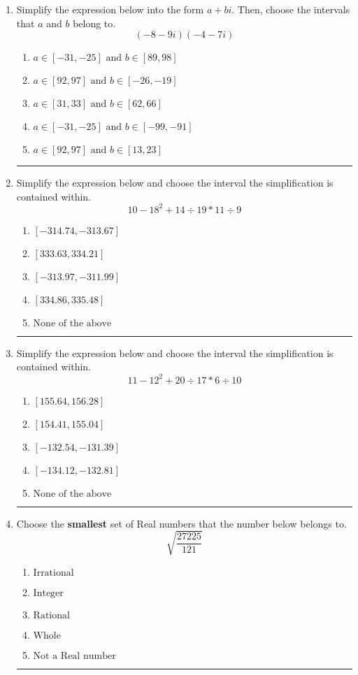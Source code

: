 \documentclass[14pt]{extbook}
\newcommand{\litem}[1]{\item#1\hspace*{-1cm}\rule{\textwidth}{0.4pt}}
\begin{document}
\begin{enumerate}
\litem{
Simplify the expression below into the form $a+bi$. Then, choose the intervals that $a$ and $b$ belong to.\[ (-8 - 9 i)(-4 - 7 i) \]\begin{enumerate}[label=\Alph*.]
\item \( a \in [-31, -25] \text{ and } b \in [89, 98] \)
\item \( a \in [92, 97] \text{ and } b \in [-26, -19] \)
\item \( a \in [31, 33] \text{ and } b \in [62, 66] \)
\item \( a \in [-31, -25] \text{ and } b \in [-99, -91] \)
\item \( a \in [92, 97] \text{ and } b \in [13, 23] \)

\end{enumerate} }
\litem{
Simplify the expression below and choose the interval the simplification is contained within.\[ 10 - 18^2 + 14 \div 19 * 11 \div 9 \]\begin{enumerate}[label=\Alph*.]
\item \( [-314.74, -313.67] \)
\item \( [333.63, 334.21] \)
\item \( [-313.97, -311.99] \)
\item \( [334.86, 335.48] \)
\item \( \text{None of the above} \)

\end{enumerate} }
\litem{
Simplify the expression below and choose the interval the simplification is contained within.\[ 11 - 12^2 + 20 \div 17 * 6 \div 10 \]\begin{enumerate}[label=\Alph*.]
\item \( [155.64, 156.28] \)
\item \( [154.41, 155.04] \)
\item \( [-132.54, -131.39] \)
\item \( [-134.12, -132.81] \)
\item \( \text{None of the above} \)

\end{enumerate} }
\litem{
Choose the \textbf{smallest} set of Real numbers that the number below belongs to.\[ \sqrt{\frac{27225}{121}} \]\begin{enumerate}[label=\Alph*.]
\item \( \text{Irrational} \)
\item \( \text{Integer} \)
\item \( \text{Rational} \)
\item \( \text{Whole} \)
\item \( \text{Not a Real number} \)


\end{enumerate}}
\end{enumerate}
\end{document}
